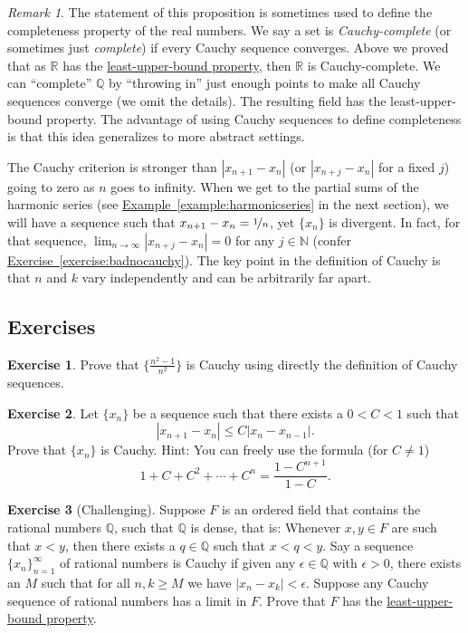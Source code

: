 \documentclass[12pt]{book}
\newcommand{\abs}[1]{\left\lvert {#1} \right\rvert}
\newcommand{\R}{{\mathbb{R}}}
\newcommand{\N}{{\mathbb{N}}}
\newcommand{\Q}{{\mathbb{Q}}}
\newcommand{\myindex}[1]{#1\index{#1}}
\theoremstyle{plain}
\theoremstyle{remark}
\newtheorem{remark}[thm]{Remark}
\theoremstyle{definition}
\theoremstyle{exercise}
\newtheorem{exercise}{Exercise}[section]
\theoremstyle{example}
\newcommand{\exerciseref}[1]{\hyperref[#1]{Exercise~\ref*{#1}}}
\newcommand{\exampleref}[1]{\hyperref[#1]{Example~\ref*{#1}}}
\begin{document}
\begin{remark}
The statement of this proposition is sometimes used to define the
completeness property of the real numbers.  We say a set is
\emph{\myindex{Cauchy-complete}} (or sometimes just \emph{\myindex{complete}})
if every Cauchy sequence converges.
Above we proved that
as $\R$ has the \hyperref[defn:lub]{least-upper-bound property}, then $\R$ is 
Cauchy-complete.
We can ``complete'' $\Q$ by ``throwing in'' just enough points to make all
Cauchy sequences converge (we omit the details).
The resulting field has the
least-upper-bound property.
The advantage of using Cauchy
sequences to define completeness is that this idea generalizes to
more abstract settings.
\end{remark}

The Cauchy criterion is stronger than 
$\abs{x_{n+1}-x_n}$ (or $\abs{x_{n+j}-x_n}$ for a fixed $j$) going to zero as
$n$ goes to
infinity.  When we get to the partial sums of the harmonic series
(see \exampleref{example:harmonicseries} in the next section), we will have
a sequence such that $x_{n+1}-x_n = \nicefrac{1}{n}$, yet $\{ x_n \}$ is
divergent.  In fact, for that sequence,
$\lim_{n\to\infty} \abs{x_{n+j}-x_n} = 0$ for
any $j \in \N$ (confer \exerciseref{exercise:badnocauchy}).
The key point in the definition of Cauchy is that $n$ and $k$
vary independently and can be arbitrarily far apart.

\subsection{Exercises}

\begin{exercise}
Prove that $\{ \frac{n^2-1}{n^2} \}$ is Cauchy using directly the definition
of Cauchy sequences.
\end{exercise}

\begin{exercise}
Let $\{ x_n \}$ be a sequence such that
there exists a $0 < C < 1$ such that
\begin{equation*}
\abs{x_{n+1} - x_n} \leq C \abs{x_{n}-x_{n-1}} .
\end{equation*}
Prove that $\{ x_n \}$ is Cauchy.
Hint:  You can freely use the formula (for $C \not= 1$)
\begin{equation*}
1+ C+ C^2 + \cdots + C^n = \frac{1-C^{n+1}}{1-C}.
\end{equation*}
\end{exercise}

\begin{exercise}[Challenging]
Suppose $F$ is an ordered field that contains the rational numbers
$\Q$, such that $\Q$ is dense,
that is: Whenever $x,y \in F$ are such that $x < y$,
then there exists a $q \in \Q$ such that $x < q < y$.
Say a sequence $\{ x_n \}_{n=1}^\infty$ of rational numbers is Cauchy
if given any $\epsilon \in \Q$ with $\epsilon > 0$, there exists
an $M$ such that for all $n,k \geq M$ we have $\abs{x_n-x_k} < \epsilon$.
Suppose any Cauchy sequence of rational numbers has a limit in $F$.
Prove that $F$ has the \hyperref[defn:lub]{least-upper-bound property}.
\end{exercise}
\end{document}

